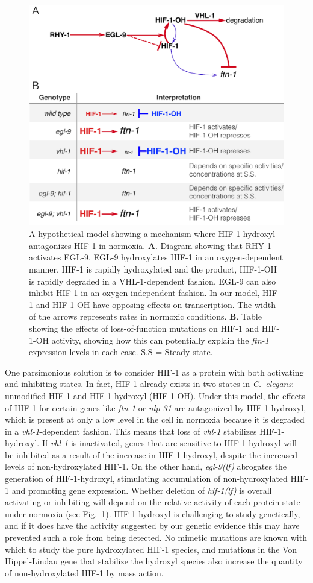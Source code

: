 \documentclass[9pt,twocolumn,twoside]{pnas-new}
\newcommand{\cel}{\emph{C.~elegans}}
\newcommand{\gene}[1]{\mbox{\emph{#1}}}
\newcommand{\nlp}{\gene{nlp-31}}
\newcommand{\ftna}{\gene{ftn-1}}
\newcommand{\egl}{\gene{egl-9(lf)}}
\newcommand{\hif}{\gene{hif-1(lf)}}
\newcommand{\hifp}{HIF-1}
\begin{document}
\begin{figure}[tbhp]
  \centering
  \includegraphics[width=.5\textwidth]{../final_figs/hif1oh_model.pdf}
  \caption{
    A hypothetical model showing a mechanism where \hifp{}-hydroxyl antagonizes
    \hifp{} in normoxia. \textbf{A}. Diagram showing that RHY-1 activates EGL-9.
    EGL-9 hydroxylates HIF-1 in an oxygen-dependent manner. HIF-1 is
    rapidly hydroxylated and the product, HIF-1-OH is rapidly degraded in a
    VHL-1-dependent fashion. EGL-9 can also inhibit
    HIF-1 in an oxygen-independent fashion. In our model, HIF-1 and HIF-1-OH
    have opposing effects on transcription. The width of the arrows represents
    rates in normoxic conditions.
    \textbf{B}. Table showing the effects of loss-of-function mutations on HIF-1
    and HIF-1-OH activity, showing how this can potentially explain the
    \gene{ftn-1} expression levels in each case. S.S = Steady-state.
  }
\label{fig:hif1oh_table}
\end{figure}

One parsimonious solution is to consider \hifp{} as a protein with both
activating and inhibiting states. In fact, \hifp{} already exists in two states
in \cel{}: unmodified \hifp{} and \hifp{}-hydroxyl (\hifp{}-OH). Under this
model, the effects of \hifp{} for certain genes like \ftna{} or \nlp{} are
antagonized by \hifp{}-hydroxyl, which is present at only a low level in the
cell in normoxia because it is degraded in a \gene{vhl-1}-dependent fashion.
This means that loss of \gene{vhl-1} stabilizes \hifp{}-hydroxyl. If \gene{vhl-1}
is inactivated, genes that are
sensitive to \hifp{}-hydroxyl will be inhibited as a result of the increase in
\hifp{}-hydroxyl, despite the increased levels of
non-hydroxylated \hifp{}. On the other hand, \egl{}
abrogates the generation of \hifp{}-hydroxyl, stimulating accumulation of
non-hydroxylated \hifp{} and promoting gene expression. Whether deletion of \hif{}
is overall activating or inhibiting will depend on the relative activity of each
protein state under normoxia (see Fig.~\ref{fig:hif1oh_table}). \hifp{}-hydroxyl
is challenging to study genetically, and if it does have the activity suggested
by our genetic evidence this may have prevented such a role from being detected.
No mimetic mutations are known with which to study the pure
hydroxylated \hifp{} species, and mutations in the Von Hippel-Lindau gene that
stabilize the hydroxyl species also increase the quantity of non-hydroxylated
\hifp{} by mass action.
\end{document}
